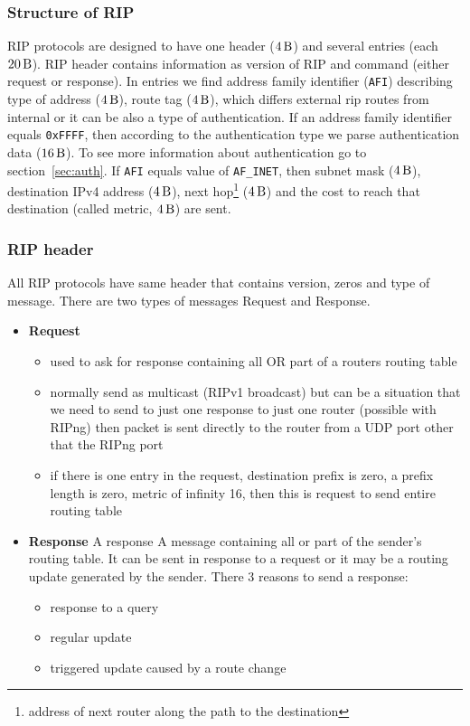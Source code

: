 \documentclass[11pt,a4paper]{article}
\begin{document}
\subsubsection{Structure of RIP}
\label{sec:ripv4}
RIP protocols are designed to have one header ($\SI{4}{\byte}$) and several entries (each $\SI{20}{\byte}$). RIP header contains information as version of RIP and command (either request or response). In entries we find address family identifier (\texttt{AFI}) describing type of address ($\SI{4}{\byte}$), route tag ($\SI{4}{\byte}$), which differs external rip routes from internal or it can be also a type of authentication. If an address family identifier equals \texttt{0xFFFF}, then according to the authentication type we parse authentication data ($\SI{16}{\byte}$). To see more information about authentication go to section~\ref{sec:auth}. If \texttt{AFI} equals value of \texttt{AF\_INET}, then subnet mask ($\SI{4}{\byte}$), destination IPv4 address ($\SI{4}{\byte}$), next hop\footnote{address of next router along the path to the destination} ($\SI{4}{\byte}$) and the cost to reach that destination (called metric, $\SI{4}{\byte}$) are sent.

\subsubsection{RIP header}
All RIP protocols have same header that contains version, zeros and type of message. There are two types of messages Request and Response.

\begin{itemize}
\item \textbf{Request}
\begin{itemize}
\item used to ask for response containing all OR part of a routers routing table  
\item normally send as multicast (RIPv1 broadcast) but can be a situation that we need to send to just one response to just one router (possible with RIPng) then packet is sent directly to the router from a UDP port other that the RIPng port
\item if there is one entry in the request, destination prefix is zero, a prefix length is zero, metric of infinity 16, then this is request to send entire routing table
\end{itemize}

\item \textbf{Response}
A response A message containing all or part of the sender's routing table.  It can be sent in response to a request or it may be a routing update generated by the sender.
There 3 reasons to send a response:
\begin{itemize}
\item response to a query
\item regular update
\item triggered update caused by a route change
\end{itemize}
\end{itemize}
\end{document}
